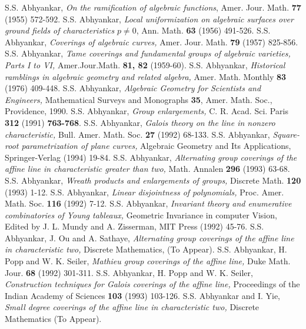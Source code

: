 \begin{thebibliography}{99}
 S.S. Abhyankar, \textit{On the ramification of algebraic functions}, Amer. Jour. Math. {\bf 77} (1955) 572-592.
 S.S. Abhyankar, \textit{Local uniformization on algebraic surfaces over ground fields of characteristics} $p\neq 0$, Ann. Math. {\bf 63} (1956) 491-526.
 S.S. Abhyankar, \textit{Coverings of algebraic curves,} Amer. Jour. Math. {\bf 79} (1957) 825-856.
 S.S. Abhyankar, \textit{Tame coverings and fundamental groups of algebraic varieties, Parts I to VI,} Amer.Jour.Math. {\bf 81, 82} (1959-60).
 S.S. Abhyankar, \textit{Historical ramblings in algebraic geometry and related algebra,} Amer. Math. Monthly {\bf 83} (1976) 409-448.
 S.S. Abhyankar, \textit{Algebraic Geometry for Scientists and Engineers,} Mathematical Surveys and Monographs {\bf 35}, Amer. Math. Soc., Providence, 1990.
 S.S. Abhyankar, \textit{Group enlargements,} C. R. Acad. Sci. Paris {\bf 312} (1991) {\bf 763-768}.
 S.S. Abhyankar, \textit{Galois theory on the line in nonzero characteristic,} Bull. Amer. Math. Soc. {\bf 27} (1992) 68-133.
 S.S. Abhyankar, \textit{Square-root parametrization of plane curves,} Algebraic Geometry and Its Applications, Springer-Verlag (1994) 19-84.
 S.S. Abhyankar, \textit{Alternating group coverings of the affine line in characteristic greater than two,} Math. Annalen {\bf 296} (1993) 63-68.
 S.S. Abhyankar, \textit{Wreath products and enlargements of groups,} Discrete Math. {\bf 120} (1993) 1-12.
 S.S. Abhyankar, \textit{Linear disjointness of polynomials,} Proc. Amer. Math. Soc. {\bf 116} (1992) 7-12.
 S.S. Abhyankar, \textit{Invariant theory and enumerative combinatories of Young tableaux,} Geometric Invariance in computer Vision, Edited by J. L. Mundy and A. Zisserman, MIT Press (1992) 45-76.
 S.S. Abhyankar, J. Ou and A. Sathaye, \textit{Alternating group coverings of the affine line in characteristic two,} Discrete Mathematics, (To Appear).
 S.S. Abhyankar, H. Popp and W. K. Seiler, \textit{Mathieu group coverings of the affine line,} Duke Math. Jour. {\bf 68} (1992) 301-311.
 S.S. Abhyankar, H. Popp and W. K. Seiler, \textit{Construction techniques for Galois coverings of the affine line,} Proceedings of the Indian Academy of Sciences {\bf 103} (1993) 103-126.
 S.S. Abhyankar and I. Yie, \textit{Small degree coverings of the affine line in characteristic two,} Discrete Mathematics (To Appear).

\end{thebibliography}
